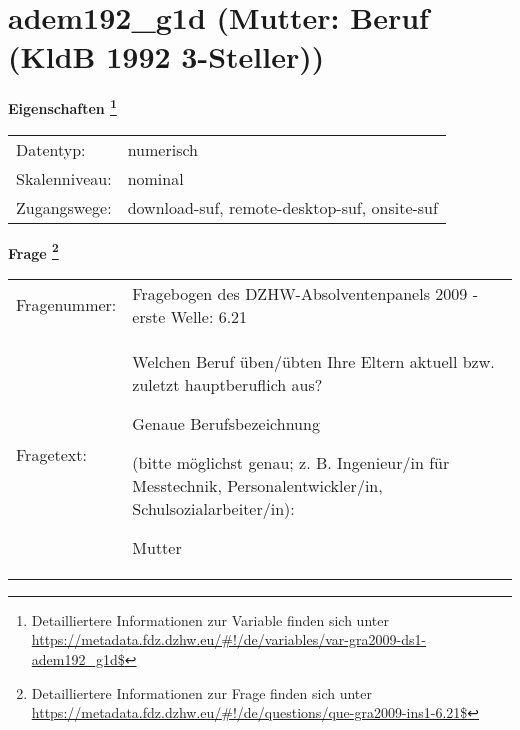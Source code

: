 
    \setcounter{footnote}{0}

    \vspace*{-1.8cm}
	\section{adem192\_g1d (Mutter: Beruf (KldB 1992 3-Steller))}
	\label{section:adem192_g1d}



    \vspace*{0.5cm}
    \noindent\textbf{Eigenschaften
	\footnote{Detailliertere Informationen zur Variable finden sich unter
		\url{https://metadata.fdz.dzhw.eu/\#!/de/variables/var-gra2009-ds1-adem192_g1d$}}}\\
	\begin{tabularx}{\hsize}{@{}lX}
	Datentyp: & numerisch \\
	Skalenniveau: & nominal \\
	Zugangswege: &
	  download-suf, 
	  remote-desktop-suf, 
	  onsite-suf
 \\
    \end{tabularx}



				\vspace*{0.5cm}
                \noindent\textbf{Frage
	                \footnote{Detailliertere Informationen zur Frage finden sich unter
		              \url{https://metadata.fdz.dzhw.eu/\#!/de/questions/que-gra2009-ins1-6.21$}}}\\
				\begin{tabularx}{\hsize}{@{}lX}
					Fragenummer: &
					  Fragebogen des DZHW-Absolventenpanels 2009 - erste Welle:
					  6.21
 \\
					Fragetext: & Welchen Beruf üben/übten Ihre Eltern aktuell bzw. zuletzt hauptberuflich aus?\par  Genaue Berufsbezeichnung\par  (bitte möglichst genau; z. B. Ingenieur/in für Messtechnik, Personalentwickler/in, Schulsozialarbeiter/in):\par  Mutter \\
				\end{tabularx}





